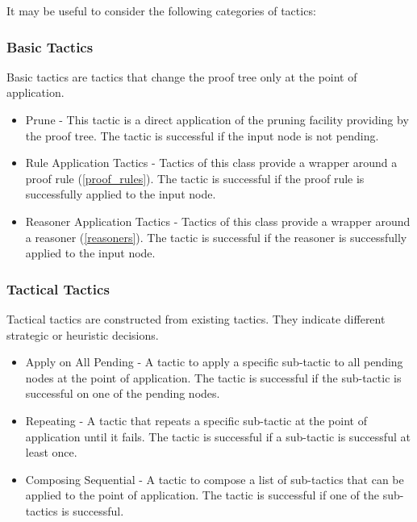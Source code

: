 It may be useful to consider the following categories of tactics:

\subsubsection{Basic Tactics}

Basic tactics are tactics that change the proof tree only at the point of application.

\begin{itemize}
	\item     Prune - This tactic is a direct application of the pruning facility providing by the proof tree. The tactic is successful if the input node is not pending. 
	\item     Rule Application Tactics - Tactics of this class provide a wrapper around a proof rule (\ref{proof_rules}). The tactic is successful if the proof rule is successfully applied to the input node. 

	\item     Reasoner Application Tactics - Tactics of this class provide a wrapper around a reasoner (\ref{reasoners}). The tactic is successful if the reasoner is successfully applied to the input node. 
\end{itemize}

\subsubsection{Tactical Tactics}

Tactical tactics are constructed from existing tactics. They indicate different strategic or heuristic decisions.

\begin{itemize}
	\item         Apply on All Pending - A tactic to apply a specific sub-tactic to all pending nodes at the point of application. The tactic is successful if the sub-tactic is successful on one of the pending nodes. 
	\item         Repeating - A tactic that repeats a specific sub-tactic at the point of application until it fails. The tactic is successful if a sub-tactic is successful at least once. 
	\item         Composing Sequential - A tactic to compose a list of sub-tactics that can be applied to the point of application. The tactic is successful if one of the sub-tactics is successful. 
\end{itemize}

